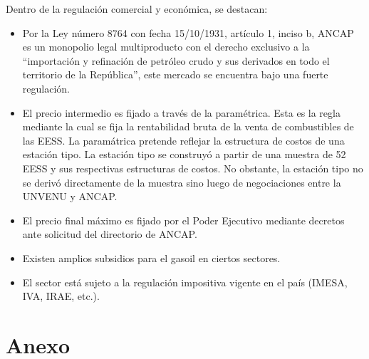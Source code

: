 \documentclass[spanish,A4,11pt]{article}
\begin{document}
Dentro de la regulación comercial y económica, se destacan:
\begin{itemize}[noitemsep]
\item Por la Ley número 8764 con fecha 15/10/1931, artículo 1, inciso b, ANCAP es un monopolio legal multiproducto con el derecho exclusivo a la ``importación y refinación de petróleo crudo y sus derivados en todo el territorio de la República'', este mercado se encuentra bajo una fuerte regulación.
\item El precio intermedio es fijado a través de la paramétrica. Esta es la regla mediante la cual se fija la rentabilidad bruta de la venta de combustibles de las EESS. La paramátrica pretende reflejar la estructura de costos de una estación tipo. La estación tipo se construyó a partir de una muestra de 52 EESS y sus respectivas estructuras de costos. No obstante, la estación tipo no se derivó directamente de la muestra sino luego de negociaciones entre la UNVENU y ANCAP.
\item El precio final máximo es fijado por el Poder Ejecutivo mediante decretos ante solicitud del directorio de ANCAP.
\item Existen amplios subsidios para el gasoil en ciertos sectores.
\item El sector está sujeto a la regulación impositiva vigente en el país (IMESA, IVA, IRAE, etc.).
\end{itemize}

\newpage

\section{Anexo}
\end{document}
